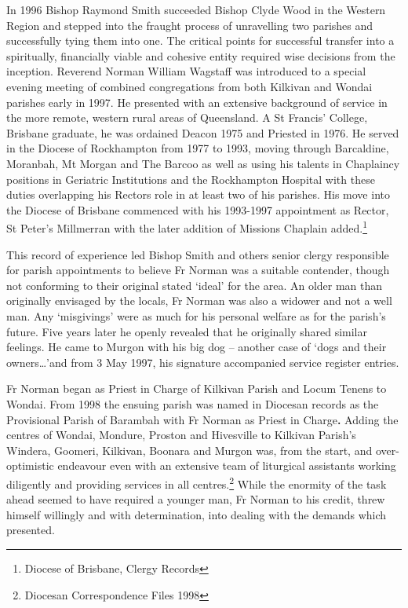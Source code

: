 In 1996 Bishop Raymond Smith succeeded Bishop Clyde Wood in the Western Region and stepped into the fraught process of unravelling two parishes and successfully tying them into one. The critical points for successful transfer into a spiritually, financially viable and cohesive entity required wise decisions from the inception. Reverend Norman William Wagstaff was introduced to a special evening meeting of combined congregations from both Kilkivan and Wondai parishes early in 1997. He presented with an extensive background of service in the more remote, western rural areas of Queensland. A St Francis' College, Brisbane graduate, he was ordained Deacon 1975 and Priested in 1976. He served in the Diocese of Rockhampton from 1977 to 1993, moving through Barcaldine, Moranbah, Mt Morgan and The Barcoo as well as using his talents in Chaplaincy positions in Geriatric Institutions and the Rockhampton Hospital with these duties overlapping his Rectors role in at least two of his parishes. His move into the Diocese of Brisbane commenced with his 1993-1997 appointment as Rector, St Peter's Millmerran with the later addition of Missions Chaplain added.\footnote{Diocese of Brisbane, Clergy Records}

This record of experience led Bishop Smith and others senior clergy responsible for parish appointments to believe Fr Norman was a suitable contender, though not conforming to their original stated `ideal' for the area. An older man than originally envisaged by the locals, Fr Norman was also a widower and not a well man. Any `misgivings' were as much for his personal welfare as for the parish's future. Five years later he openly revealed that he originally shared similar feelings. He came to Murgon with his big dog -- another case of `dogs and their owners\ldots'and from 3 May 1997, his signature accompanied service register entries.

Fr Norman began as Priest in Charge of Kilkivan Parish and Locum Tenens to Wondai. From 1998 the ensuing parish was named in Diocesan records as the Provisional Parish of Barambah with Fr Norman as Priest in Charge\textbf{.} Adding the centres of Wondai, Mondure, Proston and Hivesville to Kilkivan Parish's Windera, Goomeri, Kilkivan, Boonara and Murgon was, from the start, and over-optimistic endeavour even with an extensive team of liturgical assistants working diligently and providing services in all centres.\footnote{Diocesan Correspondence Files 1998} While the enormity of the task ahead seemed to have required a younger man, Fr Norman to his credit, threw himself willingly and with determination, into dealing with the demands which presented.

